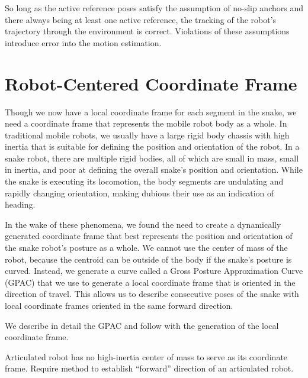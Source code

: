 So long as the active reference poses satisfy the assumption of no-slip anchors and there always being at least one active reference, the tracking of the robot's trajectory through the environment is correct. Violations of these assumptions introduce error into the motion estimation.

\section{Robot-Centered Coordinate Frame}
\label{sec:gpac}




Though we now have a local coordinate frame for each segment in the snake, we need a coordinate frame that represents the mobile robot body as a whole. In traditional mobile robots, we usually have a large rigid body chassis with high inertia that is suitable for defining the position and orientation of the robot. In a snake robot, there are multiple rigid bodies, all of which are small in mass, small in inertia, and poor at defining the overall snake's position and orientation. While the snake is executing its locomotion, the body segments are undulating and rapidly changing orientation, making dubious their use as an indication of heading.

In the wake of these phenomena, we found the need to create a dynamically generated coordinate frame that best represents the position and orientation of the snake robot's posture as a whole. We cannot use the center of mass of the robot, because the centroid can be outside of the body if the snake's posture is curved. Instead, we generate a curve called a Gross Posture Approximation Curve (GPAC) that we use to generate a local coordinate frame that is oriented in the direction of travel. This allows us to describe consecutive poses of the snake with local coordinate frames oriented in the same forward direction.

We describe in detail the GPAC and follow with the generation of the local coordinate frame.

Articulated robot has no high-inertia center of mass to serve as its coordinate frame. Require method to establish “forward” direction of an articulated robot.

